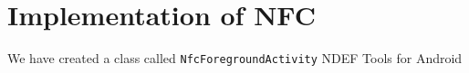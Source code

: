 \chapter{Implementation of NFC}
We have created a class called \lstinline|NfcForegroundActivity|
NDEF Tools for Android \citep{ndeftools}
